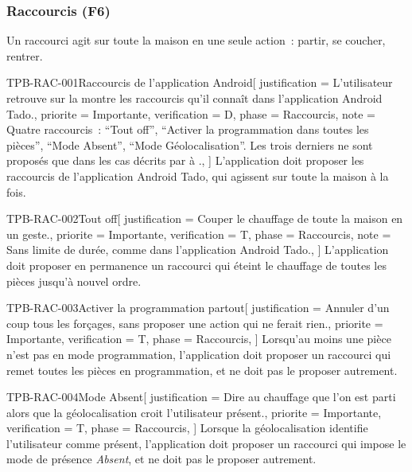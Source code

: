 \subsubsection{Raccourcis (F6)}
\label{sec:raccourcis}

Un raccourci agit sur toute la maison en une seule action~: partir, se coucher, rentrer.

\begin{exigence}{TPB-RAC-001}{Raccourcis de l'application Android}[
    justification = {L'utilisateur retrouve sur la montre les raccourcis qu'il connaît dans
                     l'application Android Tado.},
    priorite      = {Importante},
    verification  = {D},
    phase         = {Raccourcis},
    note          = {Quatre raccourcis~: \enquote{Tout off}, \enquote{Activer la
                     programmation dans toutes les pièces}, \enquote{Mode Absent},
                     \enquote{Mode Géolocalisation}. Les trois derniers ne sont proposés que
                     dans les cas décrits par  à
                     .},
  ]
  L'application doit proposer les raccourcis de l'application Android Tado, qui agissent sur
  toute la maison à la fois.
\end{exigence}

\begin{exigence}{TPB-RAC-002}{Tout off}[
    justification = {Couper le chauffage de toute la maison en un geste.},
    priorite      = {Importante},
    verification  = {T},
    phase         = {Raccourcis},
    note          = {Sans limite de durée, comme dans l'application Android Tado.},
  ]
  L'application doit proposer en permanence un raccourci qui éteint le chauffage de toutes
  les pièces jusqu'à nouvel ordre.
\end{exigence}

\begin{exigence}{TPB-RAC-003}{Activer la programmation partout}[
    justification = {Annuler d'un coup tous les forçages, sans proposer une action qui ne
                     ferait rien.},
    priorite      = {Importante},
    verification  = {T},
    phase         = {Raccourcis},
  ]
  Lorsqu'au moins une pièce n'est pas en mode programmation, l'application doit proposer un
  raccourci qui remet toutes les pièces en programmation, et ne doit pas le proposer
  autrement.
\end{exigence}

\begin{exigence}{TPB-RAC-004}{Mode Absent}[
    justification = {Dire au chauffage que l'on est parti alors que la géolocalisation
                     croit l'utilisateur présent.},
    priorite      = {Importante},
    verification  = {T},
    phase         = {Raccourcis},
  ]
  Lorsque la géolocalisation identifie l'utilisateur comme présent, l'application doit
  proposer un raccourci qui impose le mode de présence \emph{Absent}, et ne doit pas le
  proposer autrement.
\end{exigence}

